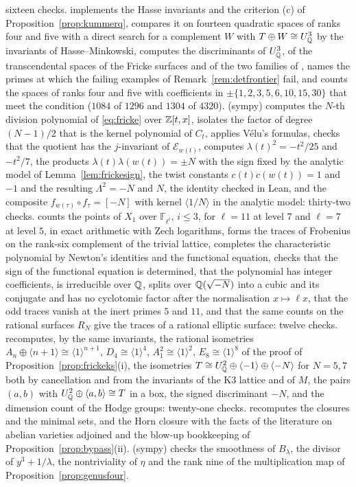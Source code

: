 sixteen checks.  implements the Hasse invariants and the criterion (c) of Proposition~\ref{prop:kummerq}, compares it on fourteen quadratic spaces of ranks four and five with a direct search for a complement $W$ with $T\oplus W\cong U_{\mathbb{Q}}^{3}$ by the invariants of Hasse--Minkowski, computes the discriminants of $U_{\mathbb{Q}}^{3}$, of the transcendental spaces of the Fricke surfaces and of the two families of \cite{Var25}, names the primes at which the failing examples of Remark~\ref{rem:detfrontier} fail, and counts the spaces of ranks four and five with coefficients in $\pm\{1,2,3,5,6,10,15,30\}$ that meet the condition ($1084$ of $1296$ and $1304$ of $4320$).  (sympy) computes the $N$-th division polynomial of \eqref{eq:fricke} over $\mathbb{Z}[t,x]$, isolates the factor of degree $(N-1)/2$ that is the kernel polynomial of $C_{t}$, applies V\'elu's formulas, checks that the quotient has the $j$-invariant of $\mathcal{E}_{w(t)}$, computes $\lambda(t)^{2}=-t^{2}/25$ and $-t^{2}/7$, the products $\lambda(t)\lambda(w(t))=\pm N$ with the sign fixed by the analytic model of Lemma~\ref{lem:frickesign}, the twist constants $c(t)c(w(t))=1$ and $-1$ and the resulting $\Lambda^{2}=-N$ and $N$, the identity checked in Lean, and the composite $f_{w(\tau)}\circ f_{\tau}=[-N]$ with kernel $\langle1/N\rangle$ in the analytic model: thirty-two checks.  counts the points of $X_{1}$ over $\mathbb{F}_{\ell^{i}}$, $i\le3$, for $\ell=11$ at level $7$ and $\ell=7$ at level $5$, in exact arithmetic with Zech logarithms, forms the traces of Frobenius on the rank-six complement of the trivial lattice, completes the characteristic polynomial by Newton's identities and the functional equation, checks that the sign of the functional equation is determined, that the polynomial has integer coefficients, is irreducible over $\mathbb{Q}$, splits over $\mathbb{Q}(\sqrt{-N})$ into a cubic and its conjugate and has no cyclotomic factor after the normalisation $x\mapsto\ell x$, that the odd traces vanish at the inert primes $5$ and $11$, and that the same counts on the rational surfaces $R_{N}$ give the traces of a rational elliptic surface: twelve checks.  recomputes, by the same invariants, the rational isometries $A_{n}\oplus\langle n+1\rangle\cong\langle1\rangle^{n+1}$, $D_{4}\cong\langle1\rangle^{4}$, $A_{1}^{2}\cong\langle1\rangle^{2}$, $E_{8}\cong\langle1\rangle^{8}$ of the proof of Proposition~\ref{prop:frickeks}(i), the isometries $T\cong U_{\mathbb{Q}}^{2}\oplus\langle-1\rangle\oplus\langle-N\rangle$ for $N=5,7$ both by cancellation and from the invariants of the K3 lattice and of $M$, the pairs $(a,b)$ with $U_{\mathbb{Q}}^{2}\oplus\langle a,b\rangle\cong T$ in a box, the signed discriminant $-N$, and the dimension count of the Hodge groups: twenty-one checks.  recomputes the closures and the minimal sets, and  the Horn closure with the facts of the literature on abelian varieties adjoined and the blow-up bookkeeping of Proposition~\ref{prop:bypass}(ii).  (sympy) checks the smoothness of $B_{\lambda}$, the divisor of $y^{3}+1/\lambda$, the nontriviality of $\eta$ and the rank nine of the multiplication map of Proposition~\ref{prop:genusfour}. 